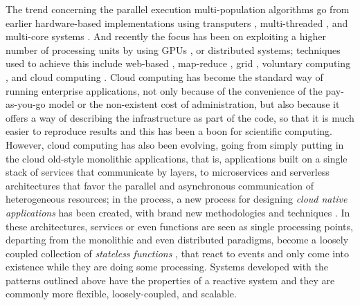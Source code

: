 \documentclass[review]{elsarticle}
\begin{document}
The trend concerning the parallel execution multi-population algorithms go from
earlier hardware-based implementations using transputers
\cite{gorges1990explicit}, multi-threaded \cite{merelo2019scaling}, and
multi-core systems \cite{Serrano2008,lai2019adaptive}. %
And recently the focus has been on exploiting a higher number of processing
units by using GPUs \cite{tan2015survey,li2007efficient}, or distributed
systems; techniques used to achieve this include web-based \cite{JSON},
map-reduce \cite{fazenda2012},  grid \cite{munawar2010design,Gonzalez09},
voluntary computing \cite{MilkyWay}, and cloud computing
\cite{GValdez2015,salza2019speed,valenzuela2015implementing,FlexGP}. %
Cloud computing has become the standard way of running
enterprise applications, not only because of the convenience of the
pay-as-you-go model or the non-existent cost of administration, but also because
it offers a way of describing the infrastructure as part of the code, so that it
is much easier to reproduce results and this has been a boon for scientific
computing.  However,  cloud computing has also been evolving, going from simply
putting in the cloud old-style monolithic applications, that is, applications
built on a single stack of services that communicate by layers, to microservices
\cite{microservices} and serverless architectures \cite{varghese2018next,Varghese2018849} that favor the parallel and asynchronous communication of
heterogeneous resources; in the process, a new process for designing {\em cloud
native applications} has been created, with brand new methodologies and
techniques \cite{Baldini2016287}. In these architectures, services or even
functions are seen as single processing points, departing from the monolithic
and even distributed paradigms, become a loosely coupled collection of {\em
stateless functions} \cite{malawski2017serverless}, that react to events and
only come into existence while they are doing some processing. %
Systems developed with the patterns outlined above have the
properties of a reactive system \cite{boner2014reactive} and they are commonly
more flexible, loosely-coupled, and scalable. %
\end{document}
